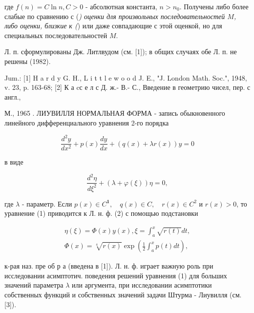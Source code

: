 \documentclass[10pt]{article}
\begin{document}
где $f(n)=C \ln n, C>0$ - абсолютная константа, $n>n_{0}$. Получены либо более слабые по сравнению с (\textit{) оценки для произвольных последовательностей $M$, либо оценки, близкие к (}) или даже совпадающие с этой оценкой, но для специальных последовательностей $M$.



Л. п. сформулированы Дж. Литлвудом (см. [1]); в общих случаях обе Л. п. не решены (1982).



Jum.: [1] H a r d y G. H., L i t t l e w o o d J. E., "J. London Math. Soc.", 1948, v. 23, p. 163-68; [2] К а cс е л с Д. ж.- В.- С., Введение в геометрию чисел, пер. с англ.,

М., 1965 . ЛИУВИЛЛЯ НОРМАЛЬНАЯ ФОРМА - запись обыкновенного линейного дифференциального уравнения 2-го порядка



\[

\frac{d^{2} y}{d x^{2}}+p(x) \frac{d y}{d x}+(q(x)+\lambda r(x)) y=0

\]



в виде



\[

\frac{d^{2} \eta}{d \xi^{2}}+(\lambda+\varphi(\xi)) \eta=0,

\]



где $\lambda$ - параметр. Если $p(x) \in C^{\mathbf{1}}, \quad q(x) \in C, \quad r(x) \in C^{2}$ и $r(x)>0$, то уравнение (1) приводится к Л. н. ф. (2) с помощью подстановки



\[

\begin{gathered}

\eta(\xi)=\Phi(x) y(x), \xi=\int_{a}^{x} \sqrt{r(t)} d t, \\

\Phi(x)=\sqrt[4]{r(x)} \exp \left(\frac{1}{2} \int_{a}^{x} p(t) d t\right),

\end{gathered}

\]



к-рая наз. пре об р а (введена в [1]). Л. н. ф. играет важную роль при исследовании асимптотич. поведения решений уравнения (1) для больших значений параметра $\lambda$ или аргумента, при исследовании асимптотики собственных функций и собственных значений задачи Штурма - Лиувилля (см. [3]).
\end{document}
